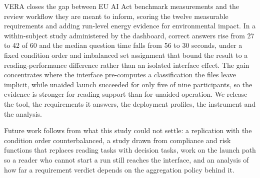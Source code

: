 \documentclass[10pt,conference]{IEEEtran}
\begin{document}
VERA closes the gap between EU AI Act benchmark measurements and the review workflow they are meant to inform, scoring the twelve measurable requirements and adding run-level energy evidence for environmental impact. In a within-subject study administered by the dashboard, correct answers rise from 27 to 42 of 60 and the median question time falls from 56 to 30 seconds, under a fixed condition order and imbalanced set assignment that bound the result to a reading-performance difference rather than an isolated interface effect. The gain concentrates where the interface pre-computes a classification the files leave implicit, while unaided launch succeeded for only five of nine participants, so the evidence is stronger for reading support than for unaided operation. We release the tool, the requirements it answers, the deployment profiles, the instrument and the analysis.

Future work follows from what this study could not settle: a replication with the condition order counterbalanced, a study drawn from compliance and risk functions that replaces reading tasks with decision tasks, work on the launch path so a reader who cannot start a run still reaches the interface, and an analysis of how far a requirement verdict depends on the aggregation policy behind it.


\clearpage
{\footnotesize


}




\end{document}
